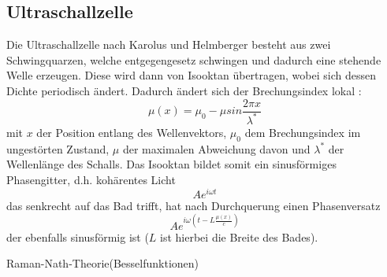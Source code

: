 \subsection{Ultraschallzelle}
Die Ultraschallzelle nach Karolus und Helmberger \cite{Karolus} besteht aus zwei Schwingquarzen, welche entgegengesetz schwingen und dadurch eine stehende Welle erzeugen. Diese wird dann von Isooktan übertragen, wobei sich dessen Dichte periodisch ändert. Dadurch ändert sich der Brechungsindex lokal \cite{Raman}: 
\begin{equation}
 \mu \left( x \right) = \mu_0 - \mu sin \frac{2 \pi x}{ \lambda^*}
\end{equation}
mit $x$ der Position entlang des Wellenvektors, $\mu_0$ dem Brechungsindex im ungestörten Zustand, $\mu$ der maximalen Abweichung davon und $\lambda^*$ der Wellenlänge des Schalls. Das Isooktan bildet somit ein sinusförmiges Phasengitter, d.h. kohärentes Licht
\begin{equation}
 A e^{i \omega t}
\end{equation}
das senkrecht auf das Bad trifft, hat nach Durchquerung einen Phasenversatz
\begin{equation}
 A e^{i \omega \left( t - L \frac{\mu \left( x \right)}{c} \right)}
\end{equation}
der ebenfalls sinusförmig ist ($L$ ist hierbei die Breite des Bades). 


Raman-Nath-Theorie(Besselfunktionen)
